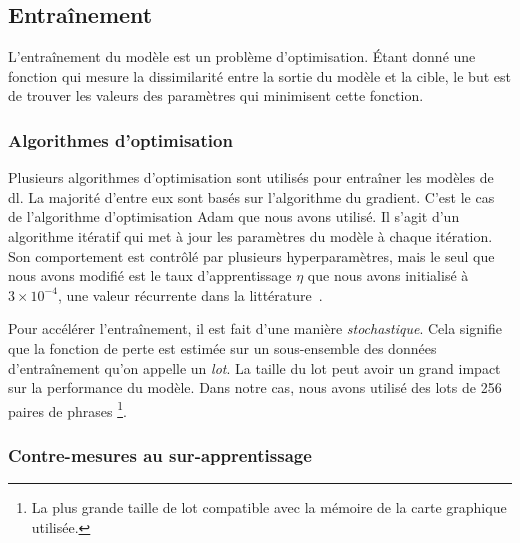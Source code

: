 \subsection{Entraînement}

L'entraînement du modèle est un problème d'optimisation.
Étant donné une fonction qui mesure la dissimilarité entre la sortie du modèle et la cible,
le but est de trouver les valeurs des paramètres qui minimisent cette fonction.

\subsubsection{Algorithmes d'optimisation}

Plusieurs algorithmes d'optimisation sont utilisés pour entraîner les modèles de \gls{dl}.
La majorité d'entre eux sont basés sur l'algorithme du gradient.
C'est le cas de l'algorithme d'optimisation Adam \cite{Kingma_Ba_2017} que nous avons utilisé.
Il s'agit d'un algorithme itératif qui met à jour les paramètres du modèle à chaque itération.
Son comportement est contrôlé par plusieurs hyperparamètres,
mais le seul que nous avons modifié est le taux d'apprentissage \(\eta\) que nous avons initialisé à
\(3\times10^{-4}\), une valeur récurrente dans la littérature~\cite{islam2022face,lu2023deformable}.

Pour accélérer l'entraînement, il est fait d'une manière \emph{stochastique}.
Cela signifie que la fonction de perte est estimée 
sur un sous-ensemble des données d'entraînement qu'on appelle un \emph{lot}.
La taille du lot peut avoir un grand impact sur la performance du modèle.
Dans notre cas, nous avons utilisé des lots de 256 paires de phrases%
\footnote{%
  La plus grande taille de lot compatible avec la mémoire de la carte graphique utilisée.
}.


\subsubsection{Contre-mesures au sur-apprentissage}

